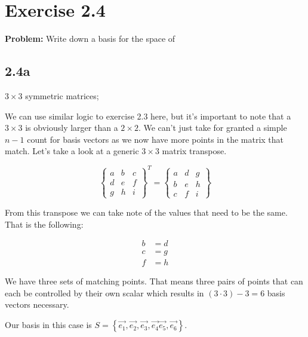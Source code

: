 \section*{Exercise 2.4}

\textbf{Problem:} Write down a basis for the space of

\subsection*{2.4a} $3 \times 3$ symmetric matrices;

We can use similar logic to exercise 2.3 here, but it's important to note that a $3 \times 3$ is obviously larger than a $2 \times 2$. We can't just take for granted a simple $n - 1$ count for basis vectors as we now have more points in the matrix that match. Let's take a look at a generic $3 \times 3$ matrix transpose.

\[
	\begin{Bmatrix}
		a & b & c \\
		d & e & f \\
		g & h & i
	\end{Bmatrix}^T
=
	\begin{Bmatrix}
		a & d & g \\
		b & e & h \\
		c & f & i
	\end{Bmatrix}
\]

From this transpose we can take note of the values that need to be the same. That is the following:

\[
	\begin{aligned}
		b &= d \\
		c &= g \\
		f &= h
	\end{aligned}
\]

We have three sets of matching points. That means three pairs of points that can each be controlled by their own scalar which results in $(3 \cdot 3) - 3 = 6$ basis vectors necessary.

Our basis in this case is $S = \left\{ \vec{e_{1}}, \vec{e_{2}}, \vec{e_{3}}, \vec{e_{4}} \vec{e_{5}}, \vec{e_{6}}\right\}$.

